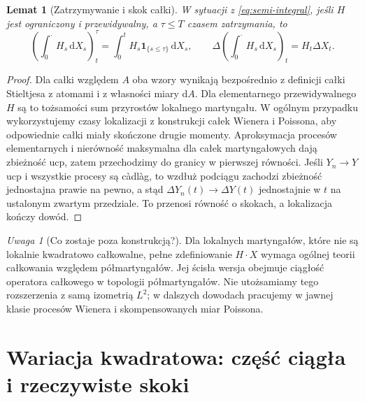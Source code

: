 \documentclass[11pt,a4paper,oneside]{report}
\numberwithin{equation}{chapter}
\theoremstyle{plain}
\newtheorem{lemat}[twierdzenie]{Lemat}
\theoremstyle{definition}
\theoremstyle{remark}
\newtheorem{uwaga}{Uwaga}[chapter]
\newcommand{\ind}[1]{\mathbf{1}_{#1}}
\newcommand{\dd}{\mathrm{d}}
\begin{document}
\begin{lemat}[Zatrzymywanie i skok całki]\label{lem:volIII:12:01}
\label{lem:semi-jumps}
W sytuacji z \eqref{eq:semi-integral}, jeśli $H$ jest
ograniczony i przewidywalny, a $\tau\le T$ czasem zatrzymania,
to
\[
\left(\int_0^{\cdot} H_s\,\dd X_s\right)^\tau_t
=\int_0^tH_s\ind{\{s\le\tau\}}\,\dd X_s,
\qquad
\Delta\left(\int_0^{\cdot} H_s\,\dd X_s\right)_t
=H_t\Delta X_t.
\]
\end{lemat}
\begin{proof}
Dla całki względem $A$ oba wzory wynikają bezpośrednio
z definicji całki Stieltjesa z atomami i z własności
miary $\dd A$. Dla elementarnego przewidywalnego $H$
są to tożsamości sum przyrostów lokalnego martyngału.
W ogólnym przypadku wykorzystujemy czasy lokalizacji z konstrukcji
całek Wienera i Poissona, aby odpowiednie całki miały skończone
drugie momenty. Aproksymacja
procesów elementarnych i nierówność maksymalna dla
całek martyngałowych dają zbieżność ucp, zatem
przechodzimy do granicy w pierwszej równości.
Jeśli $Y_n\to Y$ ucp i wszystkie procesy są càdlàg,
to wzdłuż podciągu zachodzi zbieżność jednostajna
prawie na pewno, a stąd $\Delta Y_n(t)\to\Delta Y(t)$
jednostajnie w $t$ na ustalonym zwartym przedziale.
To przenosi równość o skokach, a lokalizacja kończy dowód.
\end{proof}

\begin{uwaga}[Co zostaje poza konstrukcją?]
Dla lokalnych martyngałów, które nie są lokalnie
kwadratowo całkowalne, pełne zdefiniowanie
$H\cdot X$ wymaga ogólnej teorii całkowania względem
półmartyngałów. Jej ścisła wersja obejmuje ciągłość
operatora całkowego w topologii półmartyngałów.
Nie utożsamiamy tego rozszerzenia z samą izometrią $L^2$;
w dalszych dowodach pracujemy w jawnej klasie
procesów Wienera i skompensowanych miar Poissona.
\end{uwaga}

\section{Wariacja kwadratowa: część ciągła i rzeczywiste skoki}\label{sec:volIII:12:03}
\end{document}
